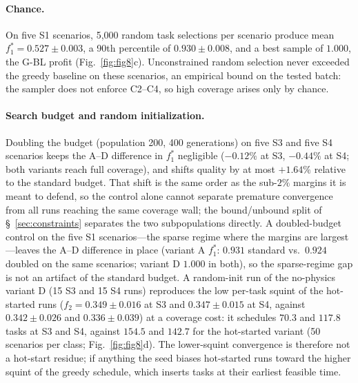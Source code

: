 \documentclass[preprint,12pt,authoryear]{elsarticle}
\begin{document}
\paragraph{Chance.}
On five S1 scenarios, 5,000 random task selections per scenario produce mean
$f_1^*=0.527 \pm 0.003$, a 90th percentile of $0.930 \pm 0.008$, and a best
sample of $1.000$, the G-BL profit (Fig.~\ref{fig:fig8}c). Unconstrained
random selection never exceeded the greedy baseline on these scenarios, an
empirical bound on the tested batch: the sampler does not enforce C2--C4, so
high coverage arises only by chance.

\paragraph{Search budget and random initialization.}
Doubling the budget (population 200, 400 generations) on five S3 and five S4
scenarios keeps the A--D difference in $f_1^*$ negligible ($-0.12\%$ at S3,
$-0.44\%$ at S4; both variants reach full coverage), and shifts quality by at
most $+1.64\%$ relative to the standard budget. That shift is the same order
as the sub-$2\%$ margins it is meant to defend, so the control alone cannot
separate premature convergence from all runs reaching the same coverage
wall; the bound/unbound split of \S~\ref{sec:constraints} separates the two
subpopulations directly. A doubled-budget control on the five S1
scenarios---the sparse regime where the margins are largest---leaves the
A--D difference in place (variant A $f_1^*$: $0.931$ standard vs.\ $0.924$
doubled on the same scenarios; variant D $1.000$ in both), so the
sparse-regime gap is not an artifact of the standard budget. A random-init
run of the no-physics variant D (15 S3 and 15 S4 runs) reproduces the low
per-task squint of the hot-started runs ($f_2=0.349\pm0.016$ at S3 and
$0.347\pm0.015$ at S4, against $0.342\pm0.026$ and $0.336\pm0.039$) at a
coverage cost: it schedules $70.3$ and $117.8$ tasks at S3 and S4, against
$154.5$ and $142.7$ for the hot-started variant (50 scenarios per class;
Fig.~\ref{fig:fig8}d). The
lower-squint convergence is therefore not a hot-start residue; if anything the
seed biases hot-started runs toward the higher squint of the greedy schedule,
which inserts tasks at their earliest feasible time.

\end{document}
